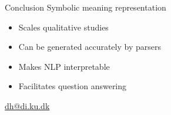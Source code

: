\documentclass[t,xcolor={svgnames,table}]{beamer}
\begin{document}
\begin{frame}{Conclusion}
Symbolic meaning representation
\begin{itemize}
\item Scales qualitative studies
\item Can be generated accurately by parsers
\item Makes NLP interpretable
\item Facilitates question answering
\end{itemize}
\vfill
{\Huge\url{dh@di.ku.dk}}
\end{frame}
\end{document}
